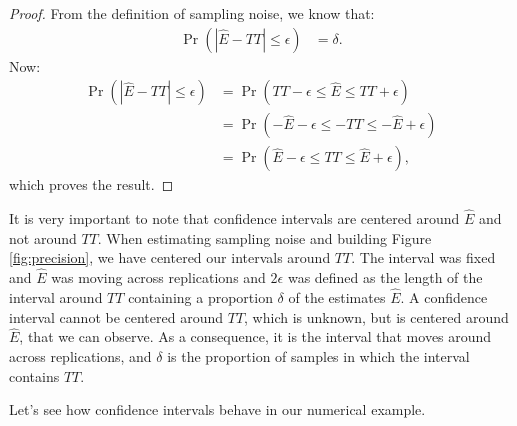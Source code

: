 \documentclass[]{book}
\theoremstyle{definition}
\theoremstyle{definition}
\theoremstyle{definition}
\theoremstyle{remark}
\let\BeginKnitrBlock\begin \let\EndKnitrBlock\end
\begin{document}
\BeginKnitrBlock{proof}
\iffalse{} {Proof. } \fi{}From the definition of sampling noise, we know that:
\begin{align*}
  \Pr(|\hat{E}-TT|\leq\epsilon) & = \delta.
\end{align*}
Now:
\begin{align*}
  \Pr(|\hat{E}-TT|\leq\epsilon) & = \Pr(TT-\epsilon\leq\hat{E}\leq TT+\epsilon)\\
                                & = \Pr(-\hat{E}-\epsilon\leq-TT\leq -\hat{E}+\epsilon)\\
                                & = \Pr(\hat{E}-\epsilon\leq TT\leq\hat{E}+\epsilon),
\end{align*}
which proves the result.
\EndKnitrBlock{proof}

It is very important to note that confidence intervals are centered around \(\hat{E}\) and not around \(TT\).
When estimating sampling noise and building Figure \ref{fig:precision}, we have centered our intervals around \(TT\).
The interval was fixed and \(\hat{E}\) was moving across replications and \(2\epsilon\) was defined as the length of the interval around \(TT\) containing a proportion \(\delta\) of the estimates \(\hat{E}\).
A confidence interval cannot be centered around \(TT\), which is unknown, but is centered around \(\hat{E}\), that we can observe.
As a consequence, it is the interval that moves around across replications, and \(\delta\) is the proportion of samples in which the interval contains \(TT\).

\BeginKnitrBlock{example}
\protect\hypertarget{exm:unnamed-chunk-36}{}{\label{exm:unnamed-chunk-36} }Let's see how confidence intervals behave in our numerical example.
\EndKnitrBlock{example}
\end{document}
